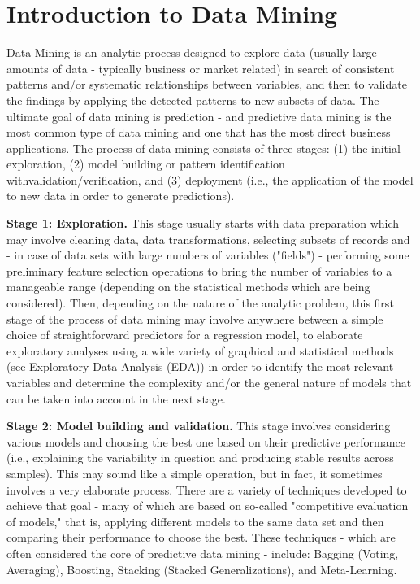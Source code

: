 ﻿\documentclass[]{report}
\begin{document}
\section{Introduction to Data Mining}


Data Mining is an analytic process designed to explore data (usually large amounts of data - typically business or market related) in search of consistent patterns and/or systematic relationships between variables, and then to validate the findings by applying the detected patterns to new subsets of data. The ultimate goal of data mining is prediction - and predictive data mining is the most common type of data mining and one that has the most direct business applications. The process of data mining consists of three stages: (1) the initial exploration, (2) model building or pattern identification withvalidation/verification, and (3) deployment (i.e., the application of the model to new data in order to generate predictions).


\textbf{Stage 1: Exploration.} This stage usually starts with data preparation which may involve cleaning data, data transformations, selecting subsets of records and - in case of data sets with large numbers of variables ("fields") - performing some preliminary feature selection operations to bring the number of variables to a manageable range (depending on the statistical methods which are being considered). Then, depending on the nature of the analytic problem, this first stage of the process of data mining may involve anywhere between a simple choice of straightforward predictors for a regression model, to elaborate exploratory analyses using a wide variety of graphical and statistical methods (see Exploratory Data Analysis (EDA)) in order to identify the most relevant variables and determine the complexity and/or the general nature of models that can be taken into account in the next stage.


\textbf{Stage 2: Model building and validation.} This stage involves considering various models and choosing the best one based on their predictive performance (i.e., explaining the variability in question and producing stable results across samples). This may sound like a simple operation, but in fact, it sometimes involves a very elaborate process. There are a variety of techniques developed to achieve that goal - many of which are based on so-called "competitive evaluation of models," that is, applying different models to the same data set and then comparing their performance to choose the best. These techniques - which are often considered the core of predictive data mining - include: Bagging (Voting, Averaging), Boosting, Stacking (Stacked Generalizations), and Meta-Learning.
\end{document}
